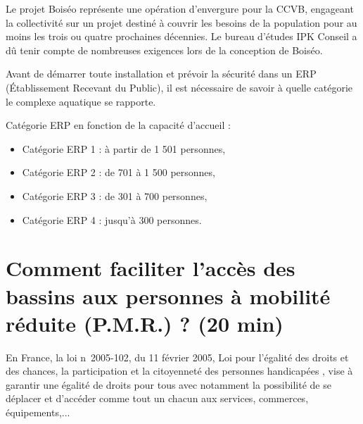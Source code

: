 

\vspace{0.5cm}

Le projet Boiséo représente une opération d'envergure pour la CCVB, engageant la collectivité sur un projet destiné à couvrir les besoins de la population pour au moins les trois ou quatre prochaines décennies. Le bureau d'études IPK Conseil a dû tenir compte de nombreuses exigences lors de la conception de Boiséo.

Avant de démarrer toute installation et prévoir la sécurité dans un ERP (Établissement Recevant du Public), il est nécessaire de savoir à quelle catégorie le complexe aquatique se rapporte.

Catégorie ERP en fonction de la capacité d'accueil :
\begin{itemize}
 \item Catégorie ERP 1 : à partir de 1 501 personnes,
 \item Catégorie ERP 2 : de 701 à 1 500 personnes,
 \item Catégorie ERP 3 : de 301 à 700 personnes,
 \item Catégorie ERP 4 : jusqu'à 300 personnes.
\end{itemize}




\section{Comment faciliter l'accès des bassins aux personnes à mobilité réduite (P.M.R.) ? (20 min)}

En France, la loi n\textdegree\ 2005-102, du 11 février 2005, \og Loi pour l'égalité des droits et des chances, la participation et la citoyenneté des personnes handicapées \fg, vise à garantir une égalité de droits pour tous avec notamment la possibilité de se déplacer et d'accéder comme
tout un chacun aux services, commerces, équipements,...

